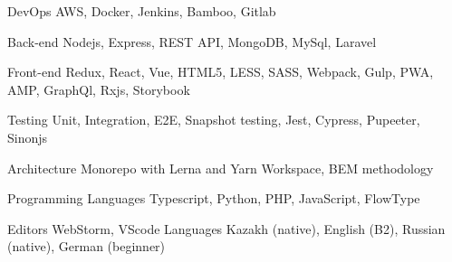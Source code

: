 

\begin{cvskills}

  \cvskill
    {DevOps} %
    {AWS, Docker, Jenkins, Bamboo, Gitlab} %

  \cvskill
    {Back-end} %
    {Nodejs, Express, REST API, MongoDB, MySql, Laravel} %

  \cvskill
    {Front-end} %
    {Redux, React, Vue, HTML5, LESS, SASS, Webpack, Gulp, PWA, AMP, GraphQl, Rxjs, Storybook} %

  \cvskill
    {Testing} %
    {Unit, Integration, E2E, Snapshot testing, Jest, Cypress, Pupeeter, Sinonjs} 

  \cvskill
    {Architecture} %
      {Monorepo with Lerna and Yarn Workspace, BEM methodology} 

  \cvskill
    {Programming Languages} %
    {Typescript, Python, PHP, JavaScript, FlowType} %

  \cvskill
    {Editors} %
    {WebStorm, VScode} 
  \cvskill
    {Languages} %
    {Kazakh (native), English (B2), Russian (native), German (beginner)} %

\end{cvskills}
